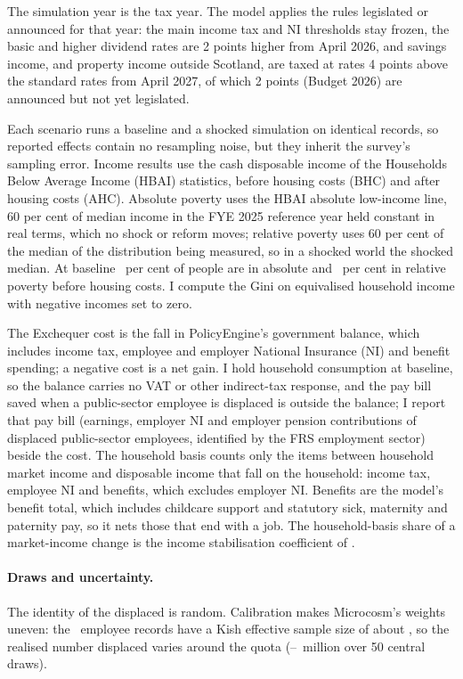 The simulation year is the \genSimTaxYear{} tax year. The model applies the rules legislated or announced for that year: the main income tax and NI thresholds stay frozen, the basic and higher dividend rates are 2 points higher from April 2026, and savings income, and property income outside Scotland, are taxed at rates 4 points above the standard rates from April 2027, of which 2 points (Budget 2026) are announced but not yet legislated.

Each scenario runs a baseline and a shocked simulation on identical records, so reported effects contain no resampling noise, but they inherit the survey's sampling error. Income results use the cash disposable income of the Households Below Average Income (HBAI) statistics, before housing costs (BHC) and after housing costs (AHC). Absolute poverty uses the HBAI absolute low-income line, 60 per cent of median income in the FYE 2025 reference year held constant in real terms, which no shock or reform moves; relative poverty uses 60 per cent of the median of the distribution being measured, so in a shocked world the shocked median. At baseline \genPovBaselineBhcPct~per cent of people are in absolute and \genPovBaselineRelBhcPct~per cent in relative poverty before housing costs. I compute the Gini on equivalised household income with negative incomes set to zero.

The Exchequer cost is the fall in PolicyEngine's government balance, which includes income tax, employee and employer National Insurance (NI) and benefit spending; a negative cost is a net gain. I hold household consumption at baseline, so the balance carries no VAT or other indirect-tax response, and the pay bill saved when a public-sector employee is displaced is outside the balance; I report that pay bill (earnings, employer NI and employer pension contributions of displaced public-sector employees, identified by the FRS employment sector) beside the cost. The household basis counts only the items between household market income and disposable income that fall on the household: income tax, employee NI and benefits, which excludes employer NI. Benefits are the model's benefit total, which includes childcare support and statutory sick, maternity and paternity pay, so it nets those that end with a job. The household-basis share of a market-income change is the income stabilisation coefficient of \citet{dolls2012}.

\paragraph{Draws and uncertainty.} The identity of the displaced is random. Calibration makes Microcosm's weights uneven: the \genDataEmployeeRows~employee records have a Kish effective sample size of about \genDataEmployeeKishN, so the realised number displaced varies around the quota (\genCentralMcDisplacedMinM--\genCentralMcDisplacedMaxM~million over 50 central draws).

